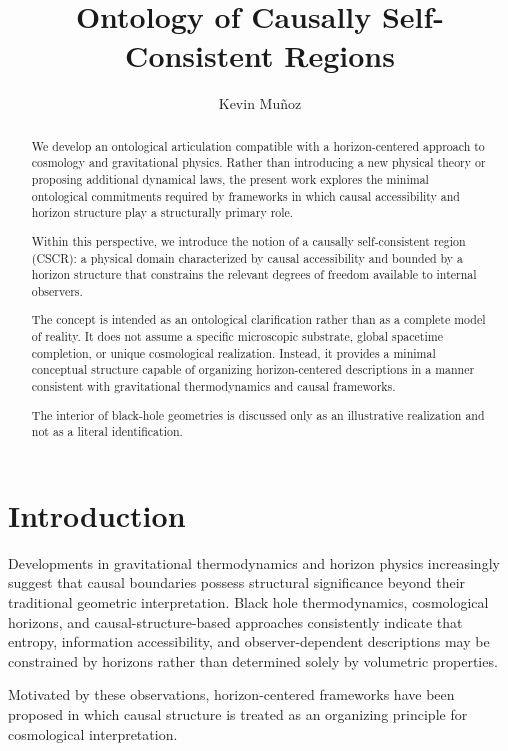 \documentclass[12pt,a4paper]{article}
\title{Ontology of Causally Self-Consistent Regions}
\author{Kevin Mu\~noz}
\date{}
\begin{document}
\maketitle

\begin{abstract}
We develop an ontological articulation compatible with a horizon-centered approach to cosmology and gravitational physics. Rather than introducing a new physical theory or proposing additional dynamical laws, the present work explores the minimal ontological commitments required by frameworks in which causal accessibility and horizon structure play a structurally primary role.

Within this perspective, we introduce the notion of a causally self-consistent region (CSCR): a physical domain characterized by causal accessibility and bounded by a horizon structure that constrains the relevant degrees of freedom available to internal observers.

The concept is intended as an ontological clarification rather than as a complete model of reality. It does not assume a specific microscopic substrate, global spacetime completion, or unique cosmological realization. Instead, it provides a minimal conceptual structure capable of organizing horizon-centered descriptions in a manner consistent with gravitational thermodynamics and causal frameworks.

The interior of black-hole geometries is discussed only as an illustrative realization and not as a literal identification.
\end{abstract}

\section{Introduction}

Developments in gravitational thermodynamics and horizon physics increasingly suggest that causal boundaries possess structural significance beyond their traditional geometric interpretation. Black hole thermodynamics, cosmological horizons, and causal-structure-based approaches consistently indicate that entropy, information accessibility, and observer-dependent descriptions may be constrained by horizons rather than determined solely by volumetric properties.

Motivated by these observations, horizon-centered frameworks have been proposed in which causal structure is treated as an organizing principle for cosmological interpretation.
\end{document}
